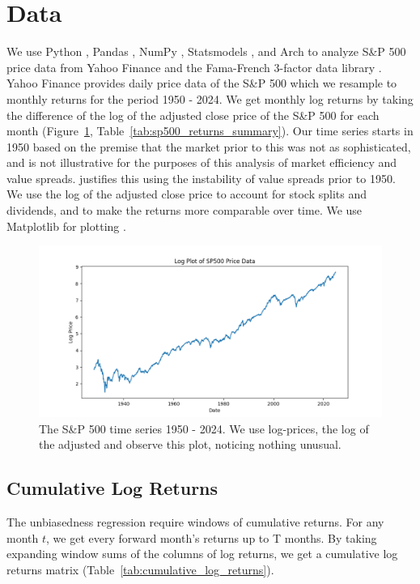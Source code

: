 \section{Data}
\label{sec:data}

We use Python \citep{python3}, Pandas \citep{reback2020pandas}, NumPy \citep{harris2020array}, Statsmodels \citep{seabold2010statsmodels}, and Arch \citep{sheppard2024arch} to analyze S\&P 500 price data from Yahoo Finance \citep{yahoo_finance_gspc} and the Fama-French 3-factor data library \citep{french_website}.
Yahoo Finance provides daily price data of the S\&P 500 which we resample to monthly returns for the period 1950 - 2024. We get monthly log returns by taking the
difference of the log of the adjusted close price of the S\&P 500 for each month (Figure~\ref{fig:sp500_returns}, Table~\ref{tab:sp500_returns_summary}). Our time series starts in 1950
based on the premise that the market prior to this was not as sophisticated, and is not illustrative for the purposes of this analysis of market efficiency and value spreads. \citep{asness_2024} justifies this using the 
instability of value spreads prior to 1950. We use the log of the adjusted close price to account for stock splits and dividends, and to make the returns more comparable over time.
We use Matplotlib for plotting \citep{Hunter2007}.
\begin{figure}[h!]
    \centering
    \includegraphics[width=1\textwidth]{../figs/SP500_Log_Price.png}
    \caption{The S\&P 500 time series 1950 - 2024. We use log-prices, the log of the adjusted and observe this plot, noticing nothing unusual.}
    \label{fig:sp500_returns}
\end{figure}

\subsection{Cumulative Log Returns}

The unbiasedness regression require windows of cumulative returns. For any month $t$, we get every forward month's returns up to T months.
By taking expanding window sums of the columns of log returns, we get a cumulative log returns matrix (Table~\ref{tab:cumulative_log_returns}).

